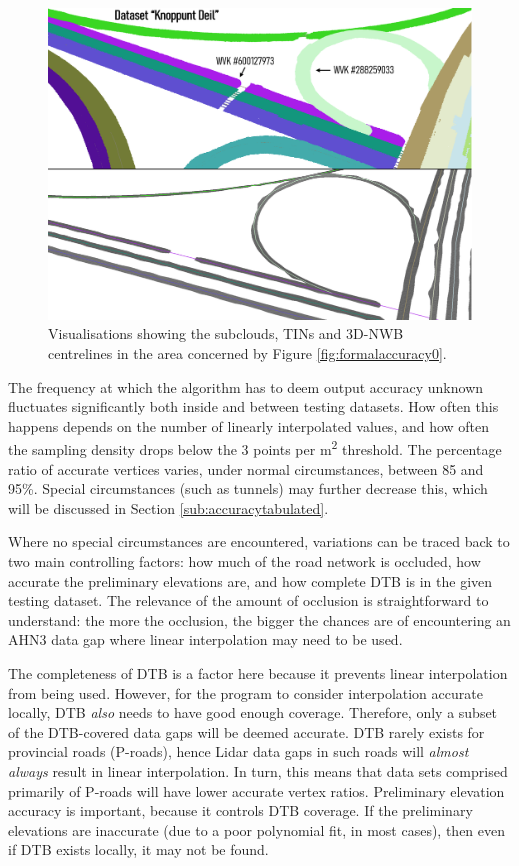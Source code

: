 \begin{figure}
    \centering
    \includegraphics[width=\linewidth]{final_report/figs/formalaccuracy1.png}
    \caption{Visualisations showing the subclouds, TINs and 3D-NWB centrelines in the area concerned by Figure \ref{fig:formalaccuracy0}.}
    \label{fig:formalaccuracy1}
\end{figure}

The frequency at which the algorithm has to deem output accuracy unknown fluctuates significantly both inside and between testing datasets. How often this happens depends on the number of linearly interpolated values, and how often the sampling density drops below the 3 points per m\textsuperscript{2} threshold. The percentage ratio of accurate vertices varies, under normal circumstances, between 85 and 95\%. Special circumstances (such as tunnels) may further decrease this, which will be discussed in Section \ref{sub:accuracytabulated}.

Where no special circumstances are encountered, variations can be traced back to two main controlling factors: how much of the road network is occluded, how accurate the preliminary elevations are, and how complete DTB is in the given testing dataset. The relevance of the amount of occlusion is straightforward to understand: the more the occlusion, the bigger the chances are of encountering an AHN3 data gap where linear interpolation may need to be used.

The completeness of DTB is a factor here because it prevents linear interpolation from being used. However, for the program to consider interpolation accurate locally, DTB \textit{also} needs to have good enough coverage. Therefore, only a subset of the DTB-covered data gaps will be deemed accurate. DTB rarely exists for provincial roads (P-roads), hence Lidar data gaps in such roads will \textit{almost always} result in linear interpolation. In turn, this means that data sets comprised primarily of P-roads will have lower accurate vertex ratios. Preliminary elevation accuracy is important, because it controls DTB coverage. If the preliminary elevations are inaccurate (due to a poor polynomial fit, in most cases), then even if DTB exists locally, it may not be found.

